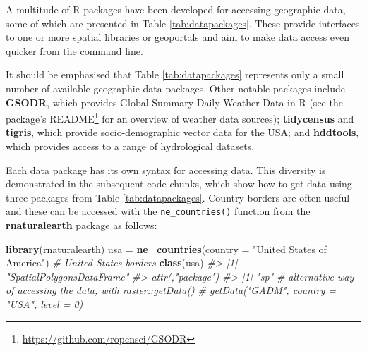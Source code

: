 \documentclass[]{krantz}
\newenvironment{Shaded}{\begin{snugshade}}{\end{snugshade}}
\newcommand{\CommentTok}[1]{\textcolor[rgb]{0.37,0.37,0.37}{\textit{#1}}}
\newcommand{\DataTypeTok}[1]{\textcolor[rgb]{0.27,0.27,0.27}{#1}}
\newcommand{\KeywordTok}[1]{\textcolor[rgb]{0.27,0.27,0.27}{\textbf{#1}}}
\newcommand{\NormalTok}[1]{#1}
\newcommand{\StringTok}[1]{\textcolor[rgb]{0.5,0.5,0.5}{#1}}
\let\rmarkdownfootnote\footnote%
\def\footnote{\protect\rmarkdownfootnote}
\renewcommand{\href}[2]{#2\footnote{\url{#1}}}
\begin{document}
A multitude of R packages have been developed for accessing geographic data, some of which are presented in Table \ref{tab:datapackages}.
These provide interfaces to one or more spatial libraries or geoportals and aim to make data access even quicker from the command line.

\begin{table}[t]

\caption[Selected R packages for geographic data retrieval.]{\label{tab:datapackages}Selected R packages for geographic data retrieval.}
\centering
{}
\end{table}

It should be emphasised that Table \ref{tab:datapackages} represents only a small number of available geographic data packages.
Other notable packages include \textbf{GSODR}, which provides Global Summary Daily Weather Data in R (see the package's \href{https://github.com/ropensci/GSODR}{README} for an overview of weather data sources);
\textbf{tidycensus} and \textbf{tigris}, which provide socio-demographic vector data for the USA; and \textbf{hddtools}, which provides access to a range of hydrological datasets.

Each data package has its own syntax for accessing data.
This diversity is demonstrated in the subsequent code chunks, which show how to get data using three packages from Table \ref{tab:datapackages}.
Country borders are often useful and these can be accessed with the \texttt{ne\_countries()} function from the \textbf{rnaturalearth} package as follows:

\begin{Shaded}
\begin{Highlighting}[]
\KeywordTok{library}\NormalTok{(rnaturalearth)}
\NormalTok{usa =}\StringTok{ }\KeywordTok{ne_countries}\NormalTok{(}\DataTypeTok{country =} \StringTok{"United States of America"}\NormalTok{) }\CommentTok{# United States borders}
\KeywordTok{class}\NormalTok{(usa)}
\CommentTok{#> [1] "SpatialPolygonsDataFrame"}
\CommentTok{#> attr(,"package")}
\CommentTok{#> [1] "sp"}
\CommentTok{# alternative way of accessing the data, with raster::getData()}
\CommentTok{# getData("GADM", country = "USA", level = 0)}
\end{Highlighting}
\end{Shaded}
\end{document}
